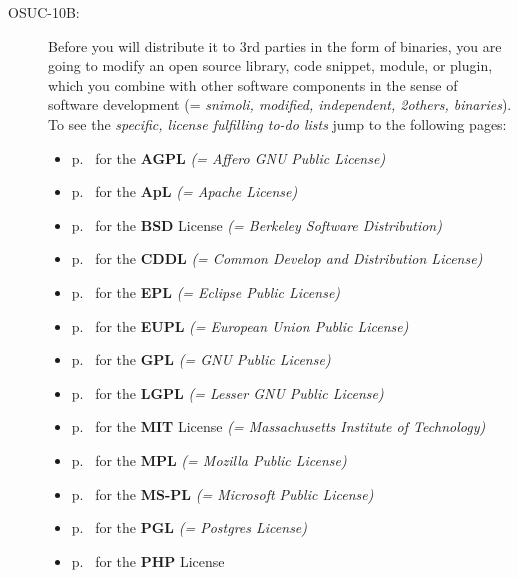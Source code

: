 \begin{description}
\item[OSUC-10B:]\label{OSUC-10B-DEF} Before you will distribute it to 3rd parties
in the form of binaries, you are going to modify an open source library, code
snippet, module, or plugin, which you combine with other software components in
the sense of software development (= \textit{snimoli, modified, independent,
2others, binaries}). To see the \textit{specific, license fulfilling to-do
lists} jump to the following pages:
  \begin{itemize}
    \item p.\ \pageref{OSUC-10B-AGPL} for the \textbf{AGPL}
      \textit{(= Affero GNU Public License)} 
    \item p.\ \pageref{OSUC-10B-Apache20} for the \textbf{ApL}
      \textit{(= Apache License)}
    \item p.\ \pageref{OSUC-10B-BSD} for the \textbf{BSD} License
      \textit{(= Berkeley Software Distribution)}
    \item p.\ \pageref{OSUC-10B-CDDL} for the \textbf{CDDL}
      \textit{(= Common Develop and Distribution License)}  
    \item p.\ \pageref{OSUC-10B-EPL} for the \textbf{EPL}
      \textit{(= Eclipse Public License)}     
    \item p.\ \pageref{OSUC-10B-EUPL} for the \textbf{EUPL}
      \textit{(= European Union Public License)} 
    \item p.\ \pageref{OSUC-10B-GPL} for the \textbf{GPL}
       \textit{(= GNU Public License)} 
    \item p.\ \pageref{OSUC-10B-LGPL} for the \textbf{LGPL}
      \textit{(= Lesser GNU Public License)}           
    \item p.\ \pageref{OSUC-10B-MIT} for the \textbf{MIT} License
       \textit{(= Massachusetts Institute of Technology)} 
    \item p.\ \pageref{OSUC-10B-MPL} for the \textbf{MPL}
      \textit{(= Mozilla Public License)}     
    \item p.\ \pageref{OSUC-10B-MS-PL} for the \textbf{MS-PL}
      \textit{(= Microsoft Public License)} 
    \item p.\ \pageref{OSUC-10B-PGL} for the \textbf{PGL}
      \textit{(= Postgres License)} 
    \item p.\ \pageref{OSUC-10B-PHP} for the \textbf{PHP} License 
  \end{itemize}

\end{description}

%

